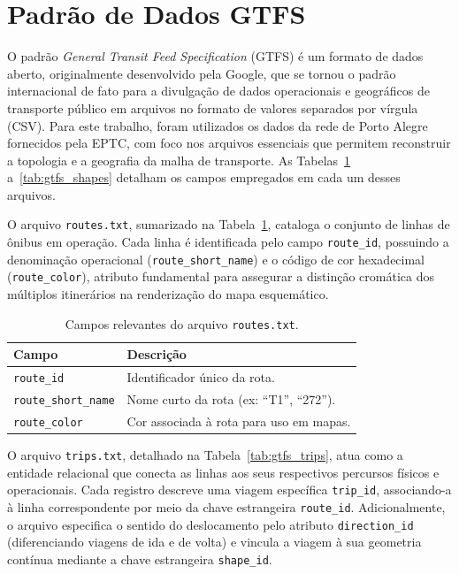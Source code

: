 \documentclass[cic,tc]{infufrgs}
\begin{document}
\section{Padrão de Dados GTFS}

O padrão \textit{General Transit Feed Specification} (GTFS) é um formato de dados aberto, originalmente desenvolvido pela Google, que se tornou o padrão internacional de fato para a divulgação de dados operacionais e geográficos de transporte público em arquivos no formato de valores separados por vírgula (CSV). Para este trabalho, foram utilizados os dados da rede de Porto Alegre fornecidos pela EPTC, com foco nos arquivos essenciais que permitem reconstruir a topologia e a geografia da malha de transporte. As Tabelas~\ref{tab:gtfs_routes} a~\ref{tab:gtfs_shapes} detalham os campos empregados em cada um desses arquivos.

O arquivo \texttt{routes.txt}, sumarizado na Tabela~\ref{tab:gtfs_routes}, cataloga o conjunto de linhas de ônibus em operação. Cada linha é identificada pelo campo \texttt{route\_id}, possuindo a denominação operacional (\texttt{route\_short\_name}) e o código de cor hexadecimal (\texttt{route\_color}), atributo fundamental para assegurar a distinção cromática dos múltiplos itinerários na renderização do mapa esquemático.

\begin{table}[H]
  \centering
  \caption{Campos relevantes do arquivo \texttt{routes.txt}.}
  \label{tab:gtfs_routes}
  \begin{tabular}{ll}
    \toprule
    \textbf{Campo} & \textbf{Descrição} \\
    \midrule
    \texttt{route\_id} & Identificador único da rota. \\
    \texttt{route\_short\_name} & Nome curto da rota (ex: ``T1'', ``272''). \\
    \texttt{route\_color} & Cor associada à rota para uso em mapas. \\
    \bottomrule
  \end{tabular}
\end{table}

O arquivo \texttt{trips.txt}, detalhado na Tabela~\ref{tab:gtfs_trips}, atua como a entidade relacional que conecta as linhas aos seus respectivos percursos físicos e operacionais. Cada registro descreve uma viagem específica \texttt{trip\_id}, associando-a à linha correspondente por meio da chave estrangeira \texttt{route\_id}. Adicionalmente, o arquivo especifica o sentido do deslocamento pelo atributo \texttt{direction\_id} (diferenciando viagens de ida e de volta) e vincula a viagem à sua geometria contínua mediante a chave estrangeira \texttt{shape\_id}.
\end{document}
